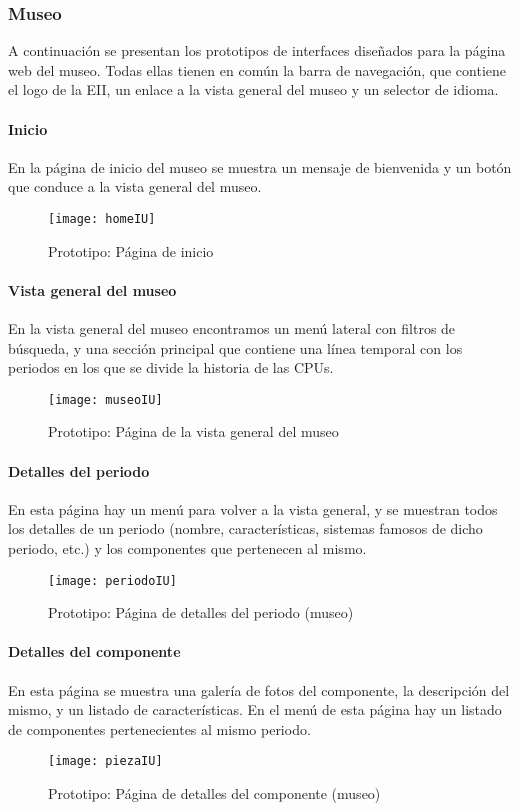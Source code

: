 \subsubsection{Museo}
A continuación se presentan los prototipos de interfaces diseñados para la página web del museo. Todas ellas tienen en común la barra de navegación, que contiene el logo de la EII, un enlace a la vista general del museo y un selector de idioma.
\paragraph*{Inicio}
En la página de inicio del museo se muestra un mensaje de bienvenida y un botón que conduce a la vista general del museo.
\begin{figure}[H]
\centering
\texttt{[image: homeIU]}
\caption{Prototipo: Página de inicio}
\end{figure}
\paragraph*{Vista general del museo}
En la vista general del museo encontramos un menú lateral con filtros de búsqueda, y una sección principal que contiene una línea temporal con los periodos en los que se divide la historia de las CPUs.
\begin{figure}[H]
\centering
\texttt{[image: museoIU]}
\caption{Prototipo: Página de la vista general del museo}\label{iu:timeline}
\end{figure}
\paragraph*{Detalles del periodo}
En esta página hay un menú para volver a la vista general, y se muestran todos los detalles de un periodo (nombre, características, sistemas famosos de dicho periodo, etc.) y los componentes que pertenecen al mismo. 
\begin{figure}[H]
\centering
\texttt{[image: periodoIU]}
\caption{Prototipo: Página de detalles del periodo (museo)}\label{iu:period-details}
\end{figure}
\paragraph*{Detalles del componente}
En esta página se muestra una galería de fotos del componente, la descripción del mismo, y un listado de características. En el menú de esta página hay un listado de componentes pertenecientes al mismo periodo.
\begin{figure}[H]
\centering
\texttt{[image: piezaIU]}
\caption{Prototipo: Página de detalles del componente (museo)}\label{iu:comp-details}
\end{figure}

